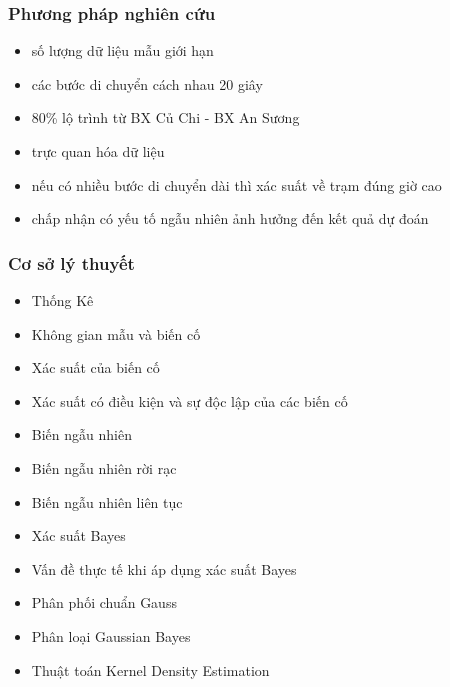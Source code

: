 \documentclass[t]{beamer}
\begin{document}

\begin{frame}
\frametitle{Phương pháp nghiên cứu}
\begin{itemize}
\item số lượng dữ liệu mẫu giới hạn
\item các bước di chuyển cách nhau 20 giây
\item 80\% lộ trình từ BX Củ Chi - BX An Sương
\item trực quan hóa dữ liệu
\item nếu có nhiều bước di chuyển dài thì xác suất về trạm đúng giờ cao
\item chấp nhận có yếu tố ngẫu nhiên ảnh hưởng đến kết quả dự đoán 
\end{itemize}
\end{frame}


\begin{frame}[t]
\frametitle{Cơ sở lý thuyết}
\begin{minipage}{0.48\linewidth}
\begin{itemize}
\item Thống Kê
\item Không gian mẫu và biến cố
\item Xác suất của biến cố
\item Xác suất có điều kiện và sự độc lập của các biến cố
\item Biến ngẫu nhiên
\item Biến ngẫu nhiên rời rạc
\item Biến ngẫu nhiên liên tục
\end{itemize}
\end{minipage}%
\hfill
\begin{minipage}{0.49\linewidth}
\begin{itemize}
\item Xác suất Bayes
\item Vấn đề thực tế khi áp dụng xác suất Bayes
\item Phân phối chuẩn Gauss
\item Phân loại Gaussian Bayes
\item Thuật toán Kernel Density Estimation 
\end{itemize}
\end{minipage}
\end{frame}

\end{document}
